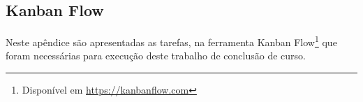\begin{apendicesenv}

\partapendices


\chapter{Kanban Flow}

Neste apêndice são apresentadas as tarefas, na ferramenta Kanban Flow\footnote{
Disponível em \url{https://kanbanflow.com}} que foram necessárias para execução 
deste trabalho de conclusão de curso.



%

\end{apendicesenv}
